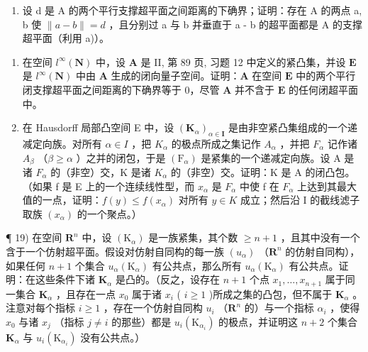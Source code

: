 \begin{enumerate}
\def\labelenumi{\alph{enumi})}
\setcounter{enumi}{1}
\tightlist
\item
  设 d 是 A 的两个平行支撑超平面之间距离的下确界；证明：存在 A 的两点 a, b 使 \(\|a - b\| = d\) ，且分别过 a 与 b 并垂直于 a - b 的超平面都是 A 的支撑超平面（利用 a)）。
\end{enumerate}

\begin{enumerate}
\def\labelenumi{\arabic{enumi})}
\setcounter{enumi}{16}
\item
  在空间 \(l^{\infty}(\mathbf{N})\) 中，设 \(\mathbf{A}\) 是 II, 第 89 页, 习题 12 中定义的紧凸集，并设 \(\mathbf{E}\) 是 \(l^{\infty}(\mathbf{N})\) 中由 \(\mathbf{A}\) 生成的闭向量子空间。证明：\(\mathbf{A}\) 在空间 \(\mathbf{E}\) 中的两个平行闭支撑超平面之间距离的下确界等于 0，尽管 \(\mathbf{A}\) 并不含于 \(\mathbf{E}\) 的任何闭超平面中。
\item
  在 Hausdorff 局部凸空间 E 中，设 \((\mathbf{K}_{\alpha})_{\alpha\in\mathbf{I}}\) 是由非空紧凸集组成的一个递减定向族。对所有 \(\alpha\in I\) ，把 \(K_{\alpha}\) 的极点所成之集记作 \(A_{\alpha}\) ，并把 \(F_{\alpha}\) 记作诸 \(A_{\beta}\) （\(\beta\geqslant\alpha\) ）之并的闭包，于是 \((\mathrm{F}_{\alpha})\) 是紧集的一个递减定向族。设 A 是诸 \(F_{\alpha}\) 的（非空）交，K 是诸 \(K_{\alpha}\) 的（非空）交。证明：K 是 A 的闭凸包。（如果 f 是 E 上的一个连续线性型，而 \(x_{\alpha}\) 是 \(F_{\alpha}\) 中使 f 在 \(F_{\alpha}\) 上达到其最大值的一点，证明：\(f(y)\leqslant f(x_{\alpha})\) 对所有 \(y\in K\) 成立；然后沿 I 的截线滤子取族 \((x_{\alpha})\) 的一个聚点。）
\end{enumerate}

¶ 19) 在空间 \(\mathbf{R}^n\) 中，设 \((\mathrm{K}_{\alpha})\) 是一族紧集，其个数 \(\geqslant n + 1\) ，且其中没有一个含于一个仿射超平面。假设对仿射自同构的每一族 \((u_{\alpha})\) （\(\mathbf{R}^n\) 的仿射自同构），如果任何 \(n + 1\) 个集合 \(u_{\alpha}(\mathrm{K}_{\alpha})\) 有公共点，那么所有 \(u_{\alpha}(\mathrm{K}_{\alpha})\) 有公共点。证明：在这些条件下诸 \(\mathbf{K}_{\alpha}\) 是凸的。（反之，设存在 \(n + 1\) 个点 \(x_1, \ldots, x_{n+1}\) 属于同一集合 \(\mathbf{K}_{\alpha}\) ，且存在一点 \(x_0\) 属于诸 \(x_i\) ( \(i \geqslant 1\) )所成之集的凸包，但不属于 \(\mathbf{K}_{\alpha}\) 。注意对每个指标 \(i \geqslant 1\) ，存在一个仿射自同构 \(u_i\) （\(\mathbf{R}^n\) 的）与一个指标 \(\alpha_i\) ，使得 \(x_0\) 与诸 \(x_j\) （指标 \(j \neq i\) 的那些）都是 \(u_i(\mathrm{K}_{\alpha_i})\) 的极点，并证明这 \(n + 2\) 个集合 \(\mathbf{K}_{\alpha}\) 与 \(u_i(\mathrm{K}_{\alpha_i})\) 没有公共点。）


